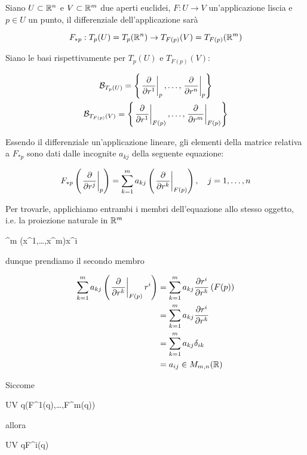 Siano $ U \subset \mathbb{R}^{n} $ e $ V \subset \mathbb{R}^{m} $ due aperti euclidei, $ F : U \to V $ un'applicazione liscia e $ p \in U $ un punto, il differenziale dell'applicazione sarà

\begin{equation}
	F_{*p} : T_{p}(U) = T_{p}(\mathbb{R}^{n}) \to T_{F(p)}(V) = T_{F(p)}(\mathbb{R}^{m})
\end{equation}

Siano le basi rispettivamente per $ T_{p}(U) $ e $ T_{F(p)}(V) $:

\begin{gather}
	\B_{T_{p}(U)} = \left\{ \eval{ \pdv{r^{1}} }_{p}, \dots, \eval{ \pdv{r^{n}} }_{p} \right\} \\
	\B_{T_{F(p)}(V)} = \left\{ \eval{ \pdv{r^{1}} }_{F(p)}, \dots, \eval{ \pdv{r^{m}} }_{F(p)} \right\}
\end{gather}

Essendo il differenziale un'applicazione lineare, gli elementi della matrice relativa a $ F_{*p} $ sono dati dalle incognite $ a_{kj} $ della seguente equazione:

\begin{equation}
	F_{*p} \left( \eval{ \pdv{r^{j}} }_{p} \right) = \sum_{k=1}^{m} a_{kj} \left( \eval{ \pdv{r^{k}} }_{F(p)} \right) \qcomma j=1,\dots,n
\end{equation}

Per trovarle, applichiamo entrambi i membri dell'equazione allo stesso oggetto, i.e. la proiezione naturale in $ \mathbb{R}^{m} $

	{\R^{m}}{\R}
	{(x^{1},\dots,x^{m})}{x^{i}}

dunque prendiamo il secondo membro

\begin{align}
	\begin{split}
		\sum_{k=1}^{m} a_{kj} \left( \eval{ \pdv{r^{k}} }_{F(p)} r^{i} \right) &= \sum_{k=1}^{m} a_{kj} \pdv{r^{i}}{r^{k}} \, (F(p)) \\
		&= \sum_{k=1}^{m} a_{kj} \pdv{r^{i}}{r^{k}} \\
		&= \sum_{k=1}^{m} a_{kj} \delta_{ik} \\
		&= a_{ij} \in M_{m,n}(\R)
	\end{split}
\end{align}

Siccome

	{U}{V}
	{q}{(F^{1}(q),\dots,F^{m}(q))}

allora

	{U}{V}
	{q}{F^{i}(q)}

